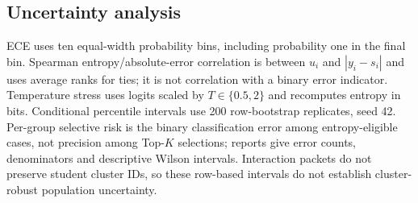 \subsection{Uncertainty analysis}
\label{app:uncertainty}
ECE uses ten equal-width probability bins, including probability one in the final bin. Spearman entropy/absolute-error correlation is between $u_i$ and $|y_i-s_i|$ and uses average ranks for ties; it is not correlation with a binary error indicator. Temperature stress uses logits scaled by $T\in\{0.5,2\}$ and recomputes entropy in bits. Conditional percentile intervals use 200 row-bootstrap replicates, seed 42. Per-group selective risk is the binary classification error among entropy-eligible cases, not precision among Top-$K$ selections; reports give error counts, denominators and descriptive Wilson intervals. Interaction packets do not preserve student cluster IDs, so these row-based intervals do not establish cluster-robust population uncertainty.

